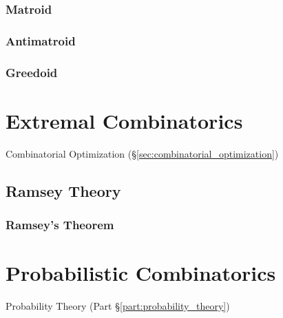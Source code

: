 \subsubsection{Matroid}\label{sec:matroid}

\subsubsection{Antimatroid}\label{sec:antimatroid}

\subsubsection{Greedoid}\label{sec:greedoid}



\section{Extremal Combinatorics}\label{sec:extremal_combinatorics}

Combinatorial Optimization (\S\ref{sec:combinatorial_optimization})



\subsection{Ramsey Theory}\label{sec:ramsey_theory}

\subsubsection{Ramsey's Theorem}\label{sec:ramseys_theorem}



\section{Probabilistic Combinatorics}\label{sec:probabilistic_combinatorics}

Probability Theory (Part \S\ref{part:probability_theory})




